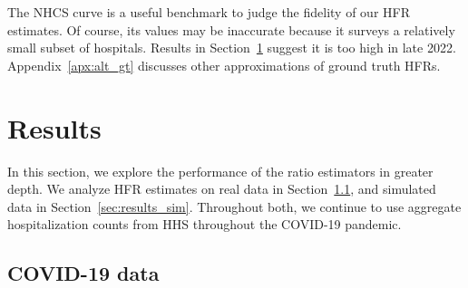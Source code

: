 \documentclass{article}
\begin{document}
The NHCS curve is a useful benchmark to judge the fidelity of our HFR estimates. Of course, its values may be inaccurate because it surveys a relatively small subset of hospitals. Results in Section~\ref{sec:results} suggest it is too high in late 2022. Appendix~\ref{apx:alt_gt} discusses other approximations of ground truth HFRs. 

\section{Results}\label{sec:results}

In this section, we explore the performance of the ratio estimators in greater depth. 
We analyze HFR estimates on real data in Section~\ref{sec:results_real}, and simulated data in Section~\ref{sec:results_sim}. Throughout both, we continue to use aggregate hospitalization counts from HHS throughout the COVID-19 pandemic. 

\subsection{COVID-19 data}\label{sec:results_real}
\end{document}
